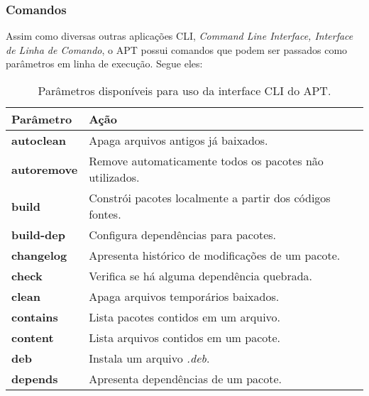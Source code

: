 \subsubsection*{Comandos} %
\label{ssub:comandos}

Assim como diversas outras aplicações CLI, \textit{Command Line Interface, Interface de Linha de Comando}, o APT possui comandos que podem ser passados como parâmetros em linha de execução. Segue eles:

\begin{longtable}{lm{11cm}}
\caption{Parâmetros disponíveis para uso da interface CLI do APT.}\\
\toprule
\textbf{Parâmetro} & \textbf{Ação} \\ 
\midrule
	\textbf{\code autoclean} & Apaga arquivos antigos já baixados. \\ %
	\rowcolor[gray]{0.8}
	\textbf{\code autoremove} & Remove automaticamente todos os pacotes não utilizados. \\ %
	\textbf{\code build} & Constrói pacotes localmente a partir dos códigos fontes. \\ %
	\rowcolor[gray]{0.8}
	\textbf{\code build-dep} & Configura dependências para pacotes. \\ %
	\textbf{\code changelog} & Apresenta histórico de modificações de um pacote. \\ %
	\rowcolor[gray]{0.8}
	\textbf{\code check} & Verifica se há alguma dependência quebrada. \\ %
	\textbf{\code clean} & Apaga arquivos temporários baixados. \\ %
	\rowcolor[gray]{0.8}
	\textbf{\code contains} & Lista pacotes contidos em um arquivo. \\ %
	\textbf{\code content} & Lista arquivos contidos em um pacote. \\ %
	\rowcolor[gray]{0.8}
	\textbf{\code deb} & Instala um arquivo \textit{.deb}. \\ %
	\textbf{\code depends} & Apresenta dependências de um pacote. \\ %

\end{longtable}
